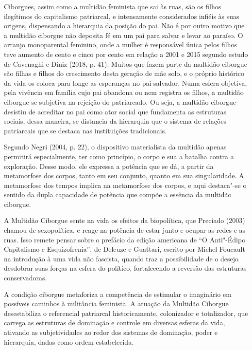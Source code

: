 Ciborgues, assim como a multidão feminista que sai às ruas, são os
filhos ilegítimos do capitalismo patriarcal, e intensamente considerados
infiéis às suas origens, dispensando a hierarquia da posição do pai. Não
é por outro motivo que a multidão ciborgue não deposita fé em um pai
para salvar e levar ao paraíso. O arranjo monoparental feminino, onde a
mulher é responsável única pelos filhos teve aumento de cento e cinco
por cento em relação a 2001 e 2015 segundo estudo de Cavenaghi e Diniz
(2018, p. 41). Muitos que fazem parte da multidão ciborgue são filhas e
filhos do crescimento desta geração de mãe solo, e o próprio histórico
da vida os coloca para longe as esperanças no pai salvador. Numa esfera
objetiva, pela vivência em família cujo pai abandona ou nem registra os
filhos, a multidão ciborgue se subjetiva na rejeição do patriarcado. Ou
seja, a multidão ciborgue desistiu de acreditar no pai como ator social
que fundamenta as estruturas sociais, dessa maneira, se distancia da
hierarquia que o sistema de relações patriarcais que se destaca nas
instituições tradicionais.

Segundo Negri (2004, p. 22), o dispositivo materialista da multidão
apenas permitirá especialmente, ter como princípio, o corpo e sua a
batalha contra a exploração. Desse modo, ele expressa a potência que se
dá, a partir da metamorfose dos corpos, tanto em seu conjunto, quanto em
sua singularidade. A metamorfose dos tempos implica na metamorfose dos
corpos, e aqui destaca"-se o sentido da dupla capacidade de potência que
compõe a essência da multidão ciborgue.

A Multidão Ciborgue sente na vida os efeitos da biopolítica, que
Preciado (2003) chamou de sexopolítica, e reage na potência de estar
junto e ocupar as redes e as ruas. Isso remete pensar sobre o prefácio
da edição americana de ``O Anti"-Édipo Capitalismo e Esquizofrenia'', de
Deleuze e Guattari, escrito por Michel Foucault na introdução à uma vida
não fascista, quando traz a possibilidade de o desejo desdobrar suas
forças na esfera do político, fortalecendo a reversão das estruturas
conservadoras.

A condição ciborgue metaforiza a competência de estimular o imaginário
em possíveis caminhos à militância feminista. A atuação da Multidão
Ciborgue desestabiliza o referencial patriarcal historicamente,
colonizador e totalizador, que carrega as estruturas de dominação e
controle em diversas esferas da vida, ativando as subjetividades ao
redor dos sistemas de dominação, poder e hierarquia, dadas como ordem
estabelecida.

